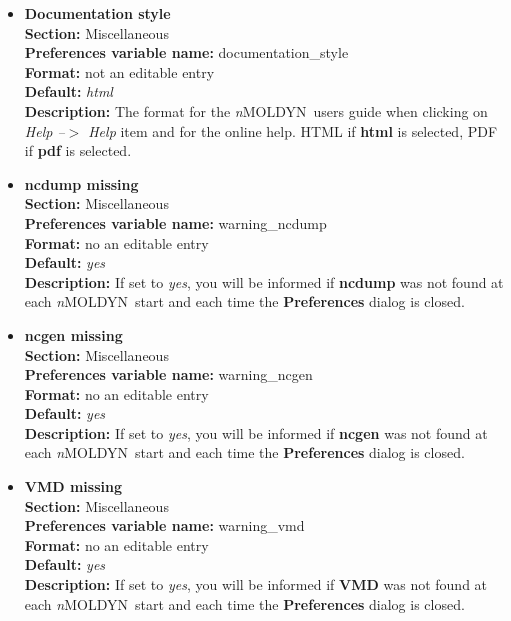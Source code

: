 \documentclass[a4paper,11pt]{report}
\newcommand{\NMOLDYN}{\textit{n}MOLDYN}
\begin{document}
\begin{itemize}
\hypertarget{preferences_documentation_style}{}
\item \textbf{Documentation style}\\
\textbf{Section:} Miscellaneous\\
\textbf{Preferences variable name:} documentation\_style\\
\textbf{Format:} not an editable entry\\
\textbf{Default:} \textit{html}\\
\textbf{Description:} The format for the \NMOLDYN\ users guide when clicking on \textit{Help --$>$ Help} item and for the 
online help. HTML if \textbf{html} is selected, PDF if \textbf{pdf} is selected.

\hypertarget{preferences_warning_ncdump}{}
\item \textbf{ncdump missing}\\
\textbf{Section:} Miscellaneous\\
\textbf{Preferences variable name:} warning\_ncdump\\
\textbf{Format:} no an editable entry\\
\textbf{Default:} \textit{yes}\\
\textbf{Description:} If set to \textit{yes}, you will be informed if \textbf{ncdump} was not found at each \NMOLDYN\ start 
and each time the \textbf{Preferences} dialog is closed.

\hypertarget{preferences_warning_ncgen}{}
\item \textbf{ncgen missing}\\
\textbf{Section:} Miscellaneous\\
\textbf{Preferences variable name:} warning\_ncgen\\
\textbf{Format:} no an editable entry\\
\textbf{Default:} \textit{yes}\\
\textbf{Description:} If set to \textit{yes}, you will be informed if \textbf{ncgen} was not found at each \NMOLDYN\ start 
and each time the \textbf{Preferences} dialog is closed.

\hypertarget{preferences_warning_vmd}{}
\item \textbf{VMD missing}\\
\textbf{Section:} Miscellaneous\\
\textbf{Preferences variable name:} warning\_vmd\\
\textbf{Format:} no an editable entry\\
\textbf{Default:} \textit{yes}\\
\textbf{Description:} If set to \textit{yes}, you will be informed if \textbf{VMD} was not found at each \NMOLDYN\ start 
and each time the \textbf{Preferences} dialog is closed.


\end{itemize}
\end{document}
